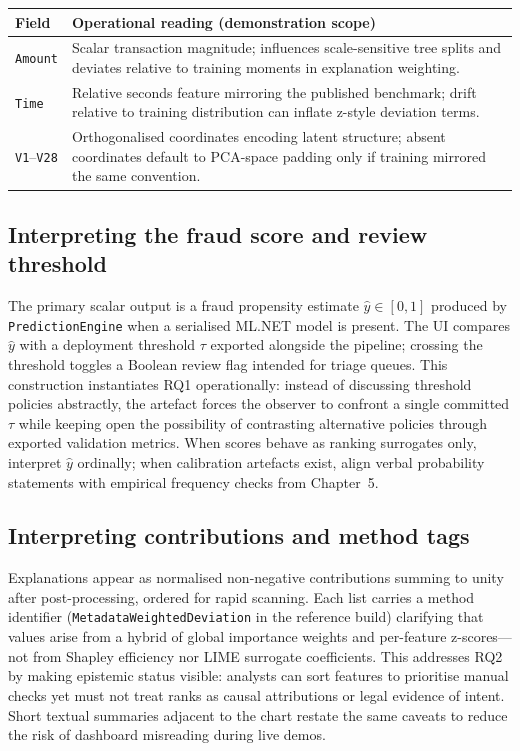 \smallskip
\noindent
\begin{tabularx}{\textwidth}{@{}l X@{}}
\toprule
\textbf{Field} & \textbf{Operational reading (demonstration scope)} \\
\midrule
\texttt{Amount} & Scalar transaction magnitude; influences scale-sensitive tree splits and deviates relative to training moments in explanation weighting. \\
\texttt{Time} & Relative seconds feature mirroring the published benchmark; drift relative to training distribution can inflate z-style deviation terms. \\
\texttt{V1}--\texttt{V28} & Orthogonalised coordinates encoding latent structure; absent coordinates default to PCA-space padding only if training mirrored the same convention. \\
\bottomrule
\end{tabularx}

\subsection{Interpreting the fraud score and review threshold}
The primary scalar output is a fraud propensity estimate $\hat{y}\in[0,1]$ produced by \texttt{Prediction\allowbreak Engine} when a serialised ML.NET model is present. The UI compares $\hat{y}$ with a deployment threshold $\tau$ exported alongside the pipeline; crossing the threshold toggles a Boolean review flag intended for triage queues. This construction instantiates RQ1 operationally: instead of discussing threshold policies abstractly, the artefact forces the observer to confront a single committed $\tau$ while keeping open the possibility of contrasting alternative policies through exported validation metrics. When scores behave as ranking surrogates only, interpret $\hat{y}$ ordinally; when calibration artefacts exist, align verbal probability statements with empirical frequency checks from Chapter~5.

\subsection{Interpreting contributions and method tags}
Explanations appear as normalised non-negative contributions summing to unity after post-processing, ordered for rapid scanning. Each list carries a method identifier (\texttt{Metadata\allowbreak Weighted\allowbreak Deviation} in the reference build) clarifying that values arise from a hybrid of global importance weights and per-feature z-scores—not from Shapley efficiency nor LIME surrogate coefficients. This addresses RQ2 by making epistemic status visible: analysts can sort features to prioritise manual checks yet must not treat ranks as causal attributions or legal evidence of intent. Short textual summaries adjacent to the chart restate the same caveats to reduce the risk of dashboard misreading during live demos.


